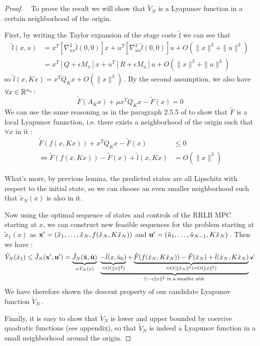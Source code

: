 \documentclass[12pt]{article}
\begin{document}
\begin{proof}~
	To prove the result we will show that $\tilde{V}_N$ is a Lyapunov function in a certain neighborhood of the origin.

	First, by writing the Taylor expansion of the stage costs $\tilde{l}$ we can see that
	\begin{align*}
		\tilde{l}(x,u)&=x^T[\nabla_{xx}^2\tilde{l}(0,0)] x+u^T[\nabla_{uu}^2\tilde{l}(0,0)]u+O(\|x\|^3+\|u\|^3)\\
		&=x^T[Q+\epsilon M_x]x+u^T[R+\epsilon M_u]u+O(\|x\|^3+\|u\|^3)
	\end{align*}
	so $\tilde{l}(x,Kx)=x^TQ_Kx+O(\|x\|^3)$\,.
	By the second assumption, we also have $\forall x\in\R^{n_x}$:
	$$\tilde{F}(A_Kx)+\mu x^T Q_K x-\tilde{F}(x)=0$$
	We can use the same reasoning as in the paragraph 2.5.5 of \cite[MPC Theory, Computation and Design]{MPC-book} to show that $\tilde{F}$ is a local Lyapunov funnction, i.e. there exists a neighborhood of the origin such that $\forall x$ in it :
	\begin{align*}
		\tilde{F}(f(x,Kx))+x^T Q_K x-\tilde{F}(x)&\leq 0\\
		\Longleftrightarrow\tilde{F}(f(x,Kx))-\tilde{F}(x)+\tilde{l}(x,Kx)&= O(\|x\|^3)
	\end{align*}

	What's more, by previous lemma, the predicted states are all Lipschitz with respect to the initial state, so we can choose an even smaller neighborhood such that $\tilde{x}_N(x)$ is also in it.

	Now using the optimal sequence of states and controls of the RRLB MPC starting at $x$, we can construct new feasible sequences for the problem starting at $\tilde{x}_1(x)$ as \newline
	$\bf{x}'=(\tilde{x}_1,\dots,\tilde{x}_N,f(\tilde{x}_N,K\tilde{x}_N))$ and $\bf{u}'=(\tilde{u}_1,\dots,\tilde{u}_{N-1},K\tilde{x}_N)$\,.
	Then we have :
	$$\tilde{V}_N(\tilde{x}_1)\leq\tilde{J}_N(\bf{x}',\bf{u}')=\underbrace{\tilde{J}_N(\tilde{\bf{x}},\tilde{\bf{u}})}_{=\tilde{V}_N(x)}~\underbrace{\underbrace{-\tilde{l}(x,\tilde{u}_0)}_{=O(\|x\|^2)}+\underbrace{\tilde{F}(f(\tilde{x}_N,K\tilde{x}_N))-\tilde{F}(\tilde{x}_N)+\tilde{l}(\tilde{x}_N,K\tilde{x}_N) }_{=O(\|\tilde{x}_N\|^3)=O(\|x\|^3)} }_{\leq-c\|x\|^2\text{ in a smaller nbh }}\checkmark$$
	We have therefore shown the descent property of our candidate Lyapunov function $\tilde{V}_N$\,.

	Finally, it is easy to show that $\tilde{V}_N$ is lower and upper bounded by coercive quadratic functions (see appendix), so that $\tilde{V}_N$ is indeed a Lyapunov function in a small neighborhood around the origin.
\end{proof}
\end{document}
